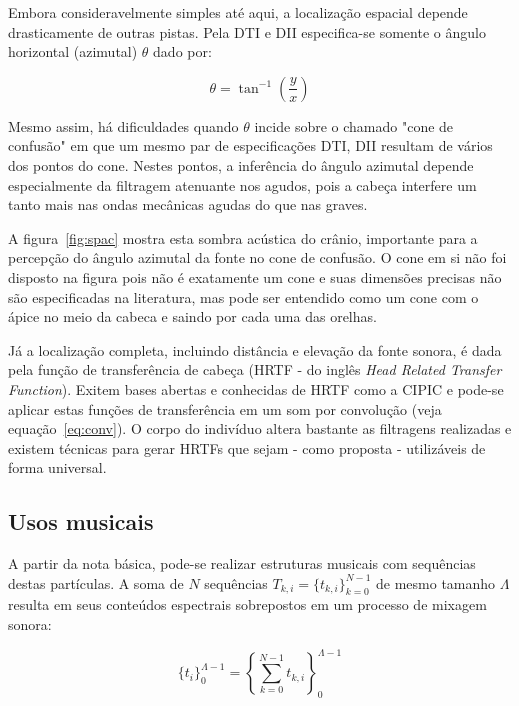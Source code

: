 Embora consideravelmente simples até aqui, a localização espacial depende drasticamente de outras pistas. Pela
DTI e DII especifica-se somente o ângulo horizontal (azimutal) $\theta$ dado por:

\begin{equation}
\theta=\tan^{-1}\left ( \frac{y}{ x }  \right )
\end{equation}

Mesmo assim, há dificuldades quando $\theta$ incide sobre o chamado "cone de confusão" em que um mesmo par de especificações DTI, DII resultam de vários dos pontos 
do cone. Nestes pontos, a inferência do ângulo azimutal depende especialmente da filtragem atenuante nos agudos, pois a cabeça interfere um tanto mais nas ondas mecânicas agudas do que nas graves.\cite{Heeger,hrtf} 

A figura~\ref{fig:spac} mostra esta sombra acústica do crânio, importante para a percepção do ângulo azimutal da fonte no cone de confusão. O cone em si não foi disposto na figura pois não é exatamente um cone e suas dimensões precisas não são especificadas na literatura, mas pode ser entendido como um cone com o ápice no meio da cabeca e saindo por cada uma das orelhas.\cite{confCone}

Já a localização completa, incluindo distância e elevação da fonte sonora, é dada pela função de transferência de cabeça (HRTF - do inglês \emph{Head Related Transfer Function}).\cite{hrtf} Exitem bases abertas e conhecidas de HRTF como a CIPIC e pode-se aplicar estas funções de transferência em um som por convolução (veja equação~\ref{eq:conv}).\cite{CIPIC} O corpo do indivíduo altera bastante as filtragens realizadas e existem técnicas para gerar HRTFs que sejam - como proposta - utilizáveis de forma universal.\cite{lazaSPA} 



\subsection{Usos musicais}


A partir da nota básica, pode-se realizar estruturas musicais com
sequências destas partículas. A soma de $N$ sequências $T_{k,i}=\{t_{k,i}\}_{k=0}^{N-1}$ de mesmo tamanho $\Lambda$ resulta em seus conteúdos espectrais sobrepostos em um processo de mixagem sonora:

\begin{equation}\label{eq:mixagem}
\{t_i\}_0^{\Lambda-1}=\left \{ \sum_{k=0}^{N-1}t_{k,i} \right \}_0^{\Lambda-1}
\end{equation}

